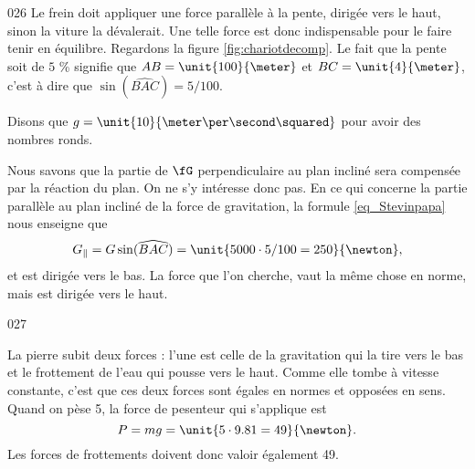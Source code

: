 \documentclass{article}
\begin{document}
\begin{corrige}{026}
Le frein doit appliquer une force parallèle à la pente, dirigée vers le haut, sinon la viture la dévalerait.  Une telle force est donc indispensable pour le faire tenir en équilibre. Regardons la figure \ref{fig:chariotdecomp}. Le fait que la pente soit de $5$ \%  signifie que $AB=\unit{100}{\meter}$ et $BC=\unit{4}{\meter}$, c'est à dire que $\sin(\widehat{BAC})=5/100$. 

Disons que $g=\unit{10}{\meter\per\second\squared}$ pour avoir des nombres ronds.

Nous savons que la partie de $\fG$ perpendiculaire au plan incliné sera compensée par la réaction du plan. On ne s'y intéresse donc pas. En ce qui concerne la partie parallèle au plan incliné de la force de gravitation, la formule \eqref{eq_Stevinpapa} nous enseigne que
\[ 
  G_{\parallel}=G\sin(\widehat{BAC})=\unit{5000\cdot 5/100=250}{\newton},
\]
et est dirigée vers le bas. La force que l'on cherche, vaut la même chose en norme, mais est dirigée vers le haut.
 
 
\end{corrige}
\begin{corrige}{027}

La pierre subit deux forces : l'une est celle de la gravitation qui la tire vers le bas et le frottement de l'eau qui pousse vers le haut. Comme elle tombe à vitesse constante, c'est que ces deux forces sont égales en normes et opposées en sens. Quand on pèse \unit{5}{\kilo\gram}, la force de pesenteur qui s'applique est
\[ 
  P=mg= \unit{5\cdot 9.81=49}{\newton}.
\]
Les forces de frottements doivent donc valoir également \unit{49}{\newton}.
\end{corrige}


\end{document}
